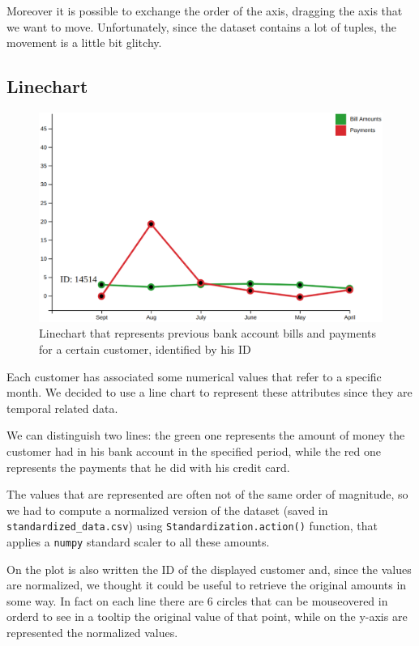 \documentclass[journal]{vgtc}                %
\begin{document}
Moreover it is possible to exchange the order of the axis, dragging the axis that we want to move. Unfortunately, since the dataset contains a lot of tuples, the movement is a little bit glitchy.


\subsection{Linechart}

\begin{figure}[h]
  \centering
  \includegraphics[scale=0.15]{linechart}
  \caption{Linechart that represents previous bank account bills and payments for a certain customer, identified by his ID}
  \label{linechart}
\end{figure}

Each customer has associated some numerical values that refer to a specific month. We decided to use a line chart to represent these attributes since they are temporal related data.

We can distinguish two lines: the green one represents the amount of money the customer had in his bank account in the specified period, while the red one represents the payments that he did
with his credit card.

The values that are represented are often not of the same order of magnitude, so we had to compute a normalized version of the dataset (saved in \texttt{standardized\_data.csv}) using \texttt{Standardization.action()} function, that applies
a \texttt{numpy} standard scaler \cite{numpy:2018} to all these amounts.

On the plot is also written the ID of the displayed customer and, since the values are normalized, we thought it could be useful to retrieve the original amounts in some way. In fact on each line there are 6 circles that can be mouseovered in orderd to see in a tooltip
the original value of that point, while on the y-axis are represented the normalized values.
\end{document}
